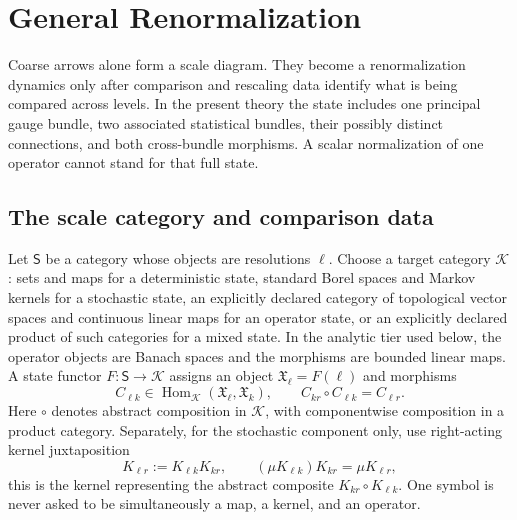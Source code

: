 \chapter{General Renormalization}
\label{ch:renormalization}

Coarse arrows alone form a scale diagram. They become a renormalization
dynamics only after comparison and rescaling data identify what is being
compared across levels. In the present theory the state includes one
principal gauge bundle, two associated statistical bundles, their possibly
distinct connections, and both cross-bundle morphisms. A scalar normalization
of one operator cannot stand for that full state.

\section{The scale category and comparison data}
\label{sec:rg-scale-category}

Let \(\mathsf S\) be a category whose objects are resolutions \(\ell\).
Choose a target category \(\mathscr K\): sets and maps for a deterministic
state, standard Borel spaces and Markov kernels for a stochastic state, an
explicitly declared category of topological vector spaces and continuous
linear maps for an operator state, or an explicitly declared product of such
categories for a mixed state.  In the analytic tier used below, the operator
objects are Banach spaces and the morphisms are bounded linear maps. A state functor
\(F:\mathsf S\to\mathscr K\) assigns an object
\(\mathfrak X_\ell=F(\ell)\) and morphisms
\begin{equation}
C_{\ell k}\in
\operatorname{Hom}_{\mathscr K}(\mathfrak X_\ell,\mathfrak X_k),
\qquad
C_{kr}\circ C_{\ell k}=C_{\ell r}.
\label{eq:rg-scale-diagram}
\end{equation}
Here \(\circ\) denotes abstract composition in \(\mathscr K\), with
componentwise composition in a product category.  Separately, for the
stochastic component only, use right-acting kernel juxtaposition
\begin{equation}
K_{\ell r}:=K_{\ell k}K_{kr},
\qquad
(\mu K_{\ell k})K_{kr}=\mu K_{\ell r},
\label{eq:rg-right-acting-kernel-composition}
\end{equation}
this is the kernel representing the abstract composite
\(K_{kr}\circ K_{\ell k}\). One symbol is never asked to be simultaneously a
map, a kernel, and an operator. 

